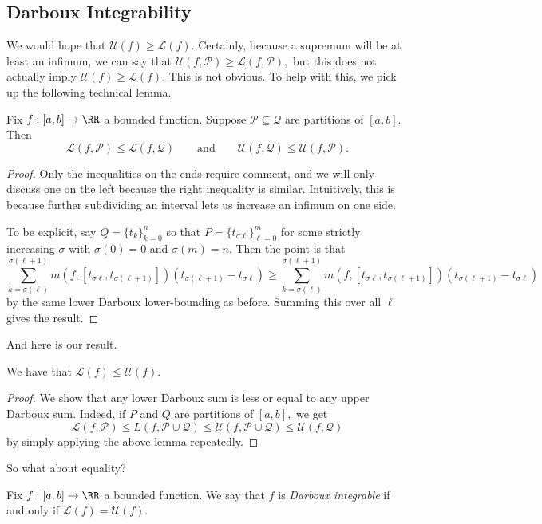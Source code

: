 \documentclass[../notes.tex]{subfiles}
\begin{document}
\subsection{Darboux Integrability}
We would hope that $\mathcal U(f)\ge\mathcal L(f).$ Certainly, because a supremum will be at least an infimum, we can say that $\mathcal U(f,\mathcal P)\ge\mathcal L(f,\mathcal P),$ but this does not actually imply $\mathcal U(f)\ge\mathcal L(f).$ This is not obvious. To help with this, we pick up the following technical lemma.
\begin{lemma}
	Fix $f:[a,b]\to\RR$ a bounded function. Suppose $\mathcal P\subseteq\mathcal Q$ are partitions of $[a,b].$ Then
	\[\mathcal L(f,\mathcal P)\le\mathcal L(f,\mathcal Q)\qquad\text{and}\qquad\mathcal U(f,\mathcal Q)\le\mathcal U(f,\mathcal P).\]
\end{lemma}
\begin{proof}
	Only the inequalities on the ends require comment, and we will only discuss one on the left because the right inequality is similar. Intuitively, this is because further subdividing an interval lets us increase an infimum on one side.

	To be explicit, say $Q=\{t_k\}_{k=0}^n$ so that $P=\{t_{\sigma\ell}\}_{\ell=0}^m$ for some strictly increasing $\sigma$ with $\sigma(0)=0$ and $\sigma(m)=n.$ Then the point is that
	\[\sum_{k=\sigma(\ell)}^{\sigma(\ell+1)}m(f,[t_{\sigma\ell},t_{\sigma(\ell+1)}])(t_{\sigma(\ell+1)}-t_{\sigma\ell})\ge\sum_{k=\sigma(\ell)}^{\sigma(\ell+1)}m(f,[t_{\sigma\ell},t_{\sigma(\ell+1)}])(t_{\sigma(\ell+1)}-t_{\sigma\ell})\]
	by the same lower Darboux lower-bounding as before. Summing this over all $\ell$ gives the result.
\end{proof}
And here is our result.
\begin{proposition}
	We have that $\mathcal L(f)\le\mathcal U(f).$
\end{proposition}
\begin{proof}
	We show that any lower Darboux sum is less or equal to any upper Darboux sum. Indeed, if $P$ and $Q$ are partitions of $[a,b],$ we get
	\[\mathcal L(f,\mathcal P)\le L(f,\mathcal P\cup\mathcal Q)\le\mathcal U(f,\mathcal P\cup\mathcal Q)\le\mathcal U(f,\mathcal Q)\]
	by simply applying the above lemma repeatedly.
\end{proof}
So what about equality?
\begin{definition}[Integrable]
	Fix $f:[a,b]\to\RR$ a bounded function. We say that $f$ is \textit{Darboux integrable} if and only if $\mathcal L(f)=\mathcal U(f).$
\end{definition}
\end{document}
